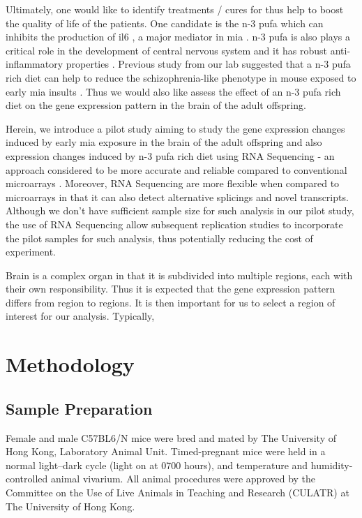 Ultimately, one would like to identify treatments / cures for  thus help to boost the quality of life of the  patients.
One candidate is the n-3 \gls{pufa} which can inhibits the production of \gls{il6} \citep{Trebble2003}, a major mediator in \gls{mia} \citep{Smith2007}.
n-3 \gls{pufa} is also plays a critical role in the development of central nervous system \citep{Clandinin1999} and it has robust anti-inflammatory properties \citep{Trebble2003}.
Previous study from our lab suggested that a n-3 \gls{pufa} rich diet can help to reduce the schizophrenia-like phenotype in mouse exposed to early \gls{mia} insults \citep{Li2015}. 
Thus we would also like assess the effect of an n-3 \gls{pufa} rich diet on the gene expression pattern in the brain of the adult offspring.

Herein, we introduce a pilot study aiming to study the gene expression changes induced by early \gls{mia} exposure in the brain of the adult offspring and also expression changes induced by n-3 \gls{pufa} rich diet using RNA Sequencing - an approach considered to be more accurate and reliable compared to conventional microarrays \citep{Wang2009d}.
Moreover, RNA Sequencing are more flexible when compared to microarrays in that it can also detect alternative splicings and novel transcripts. 
Although we don't have sufficient sample size for such analysis in our pilot study, the use of RNA Sequencing allow subsequent replication studies to incorporate the pilot samples for such analysis, thus potentially reducing the cost of experiment.

Brain is a complex organ in that it is subdivided into multiple regions, each with their own responsibility.
Thus it is expected that the gene expression pattern differs from region to regions.
It is then important for us to select a region of interest for our analysis. 
Typically, 



\section{Methodology}
\subsection{Sample Preparation}
Female and male C57BL6/N mice were bred and mated by The University of Hong Kong, Laboratory Animal Unit. 
Timed-pregnant mice were held in a normal light–dark cycle (light on at 0700 hours), and temperature and humidity-controlled animal vivarium. 
All animal procedures were approved by the Committee on the Use of Live Animals in Teaching and Research (CULATR) at The University of Hong Kong.

